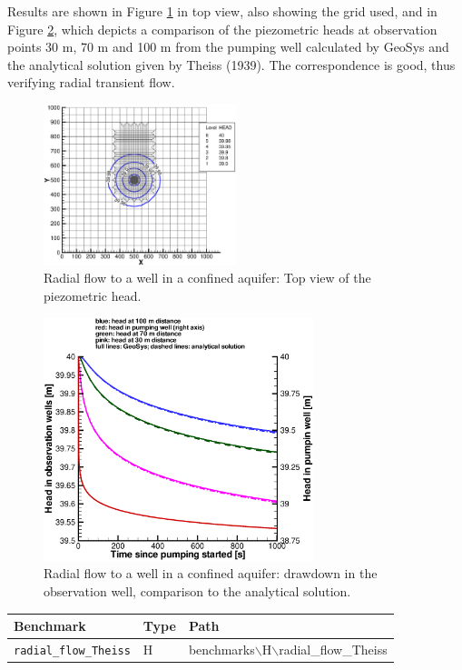 Results are shown in Figure \ref{radial_flow_theiss_top_view} in top view, also showing the grid used, and in Figure \ref{radial_flow_theiss_drawdown}, which depicts a comparison of the piezometric heads at observation points 30 m, 70 m and 100 m from the pumping well calculated by GeoSys and the analytical solution given by Theiss (1939). The correspondence is good, thus verifying radial transient flow.

\begin{figure}[htbp]
\centering
\includegraphics[width=0.5\textwidth]{C/figures/radial_flow_theiss_top_view.eps}
\caption{Radial flow to a well in a confined aquifer: Top view of the piezometric head.}
\label{radial_flow_theiss_top_view}
\end{figure}

\begin{figure}[htbp]
\centering
\includegraphics[width=0.7\textwidth]{C/figures/radial_flow_theiss_drawdown.eps}
\caption{Radial flow to a well in a confined aquifer: drawdown in the observation well, comparison to the analytical solution.}
\label{radial_flow_theiss_drawdown}
\end{figure}


\begin{table}[htbp]
\centering
\begin{tabular}{|l|l|l|}
\hline
Benchmark & Type & Path \\
\hline
\texttt{radial\_flow\_Theiss}& H &  benchmarks$\backslash$H$\backslash$radial\_flow\_Theiss  \\			
\hline
\end{tabular}
\end{table}

